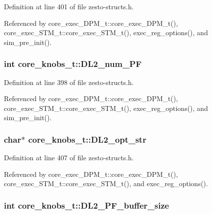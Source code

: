 Definition at line 401 of file zesto-structs.h.

Referenced by core\_\-exec\_\-DPM\_\-t::core\_\-exec\_\-DPM\_\-t(), core\_\-exec\_\-STM\_\-t::core\_\-exec\_\-STM\_\-t(), exec\_\-reg\_\-options(), and sim\_\-pre\_\-init().
\subsubsection[{DL2\_\-num\_\-PF}]{\setlength{\rightskip}{0pt plus 5cm}int {\bf core\_\-knobs\_\-t::DL2\_\-num\_\-PF}}\label{structcore__knobs__t_e34ca10986e72600bcd62707dff6fd99}




Definition at line 398 of file zesto-structs.h.

Referenced by core\_\-exec\_\-DPM\_\-t::core\_\-exec\_\-DPM\_\-t(), core\_\-exec\_\-STM\_\-t::core\_\-exec\_\-STM\_\-t(), exec\_\-reg\_\-options(), and sim\_\-pre\_\-init().
\subsubsection[{DL2\_\-opt\_\-str}]{\setlength{\rightskip}{0pt plus 5cm}char$\ast$ {\bf core\_\-knobs\_\-t::DL2\_\-opt\_\-str}}\label{structcore__knobs__t_a3392e4aae5350aba828cc2eb860bdc0}




Definition at line 407 of file zesto-structs.h.

Referenced by core\_\-exec\_\-DPM\_\-t::core\_\-exec\_\-DPM\_\-t(), core\_\-exec\_\-STM\_\-t::core\_\-exec\_\-STM\_\-t(), and exec\_\-reg\_\-options().
\subsubsection[{DL2\_\-PF\_\-buffer\_\-size}]{\setlength{\rightskip}{0pt plus 5cm}int {\bf core\_\-knobs\_\-t::DL2\_\-PF\_\-buffer\_\-size}}\label{structcore__knobs__t_5230649cf33c36d7e67deaf248dae6af}




